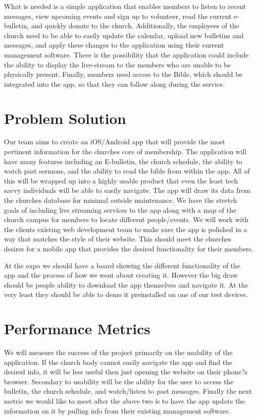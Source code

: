 \documentclass[letterpaper,10pt,draftclsnofoot,onecolumn,titlepage]{IEEEtran}
\begin{document}
	What is needed is a simple application that enables members to listen to recent messages, view upcoming events and sign up to volunteer, read the current e-bulletin, and quickly donate to the church. 
	Additionally, the employees of the church need to be able to easily update the calendar, upload new bulletins and messages, and apply these changes to the application using their current management software. 
	There is the possibility that the application could include the ability to display the live-stream to the members who are unable to be physically present. 
	Finally, members need access to the Bible, which should be integrated into the app, so that they can follow along during the service. 	
	
	\section*{Problem Solution}
	Our team aims to create an iOS/Android app that will provide the most pertinent information for the churches core of membership. 
	The application will have many features including an E-bulletin, the church schedule, the ability to watch past sermons, and the ability to read the bible from within the app. 
	All of this will be wrapped up into a highly usable product that even the least tech savvy individuals will be able to easily navigate. 
	The app will draw its data from the churches database for minimal outside maintenance. 
	We have the stretch goals of including live streaming services to the app along with a map of the church campus for members to locate different people/events.  
	We will work with the clients existing web development team to make sure the app is polished in a way that matches the style of their website. 
	This should meet the churches desires for a mobile app that provides the desired functionality for their members.

	At the expo we should have a board showing the different functionality of the app and the process of how we went about creating it. 
	However the big draw should be people ability to download the app themselves and navigate it. 
	At the very least they should be able to demo it preinstalled on one of our test devices.
	
	\section*{Performance Metrics}
	We will measure the success of the project primarily on the usability of the application. 
	If the church body cannot easily navigate the app and find the desired info, it will be less useful then just opening the website on their phone?s browser. 
	Secondary to usability will be the ability for the user to access the bulletin, the church schedule, and watch/listen to past messages. 
	Finally the next metric we would like to meet after the above two is to have the app update the information on it by pulling info from their existing management software.
	
\end{document}
